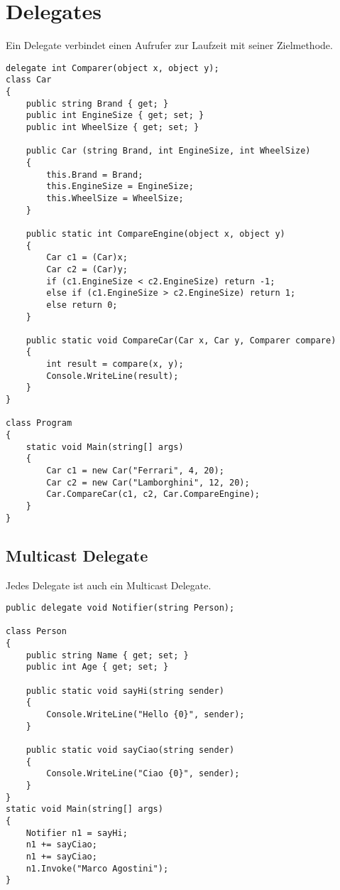 \section{Delegates}
Ein Delegate verbindet einen Aufrufer zur Laufzeit mit seiner Zielmethode.

\begin{lstlisting}
delegate int Comparer(object x, object y);
class Car
{
    public string Brand { get; }
    public int EngineSize { get; set; }
    public int WheelSize { get; set; }

    public Car (string Brand, int EngineSize, int WheelSize)
    {
        this.Brand = Brand;
        this.EngineSize = EngineSize;
        this.WheelSize = WheelSize;
    }

    public static int CompareEngine(object x, object y)
    {
        Car c1 = (Car)x;
        Car c2 = (Car)y;
        if (c1.EngineSize < c2.EngineSize) return -1;
        else if (c1.EngineSize > c2.EngineSize) return 1;
        else return 0;
    }

    public static void CompareCar(Car x, Car y, Comparer compare)
    {
        int result = compare(x, y);
        Console.WriteLine(result);
    }
}

class Program
{
    static void Main(string[] args)
    {
        Car c1 = new Car("Ferrari", 4, 20);
        Car c2 = new Car("Lamborghini", 12, 20);
        Car.CompareCar(c1, c2, Car.CompareEngine);
    }
}
\end{lstlisting}


\subsection{Multicast Delegate}
Jedes Delegate ist auch ein Multicast Delegate.
\begin{lstlisting}
public delegate void Notifier(string Person);

class Person
{
    public string Name { get; set; }
    public int Age { get; set; }

    public static void sayHi(string sender)
    {
        Console.WriteLine("Hello {0}", sender);
    }

    public static void sayCiao(string sender)
    {
        Console.WriteLine("Ciao {0}", sender);
    }
}
static void Main(string[] args)
{
    Notifier n1 = sayHi;
    n1 += sayCiao;
    n1 += sayCiao;
    n1.Invoke("Marco Agostini");
}
\end{lstlisting}


